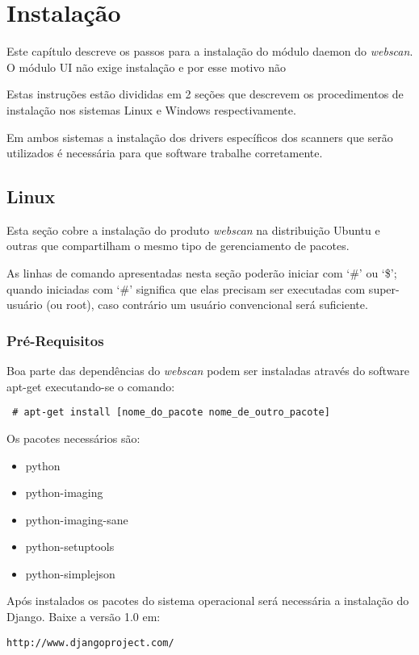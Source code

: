 \section{Instalação}
\label{sec:instalacao}
Este capítulo descreve os passos para a instalação do módulo daemon do
{\it webscan}. O módulo UI não exige instalação e por esse motivo não

Estas instruções estão divididas em 2 seções que descrevem os
procedimentos de instalação nos sistemas Linux e Windows respectivamente.

Em ambos sistemas a instalação dos drivers específicos dos scanners que 
serão utilizados é necessária para que software trabalhe corretamente.

\subsection{Linux}
Esta seção cobre a instalação do produto {\it webscan} na distribuição
Ubuntu e outras que compartilham o mesmo tipo de gerenciamento de pacotes.

As linhas de comando apresentadas nesta seção poderão iniciar com `\#' ou
`\$'; quando iniciadas com `\#' significa que elas precisam ser executadas 
com super-usuário (ou root), caso contrário um usuário convencional será
suficiente.

\subsubsection{Pré-Requisitos}
Boa parte das dependências do {\it webscan} podem ser instaladas através 
do software apt-get executando-se o comando:

\begin{verbatim}
 # apt-get install [nome_do_pacote nome_de_outro_pacote]
\end{verbatim}

Os pacotes necessários são:

\begin{itemize}
    \item python
    \item python-imaging
    \item python-imaging-sane
    \item python-setuptools
    \item python-simplejson
\end{itemize}

Após instalados os pacotes do sistema operacional será necessária a 
instalação do Django. Baixe a versão 1.0 em:
\begin{verbatim}
http://www.djangoproject.com/
\end{verbatim}

